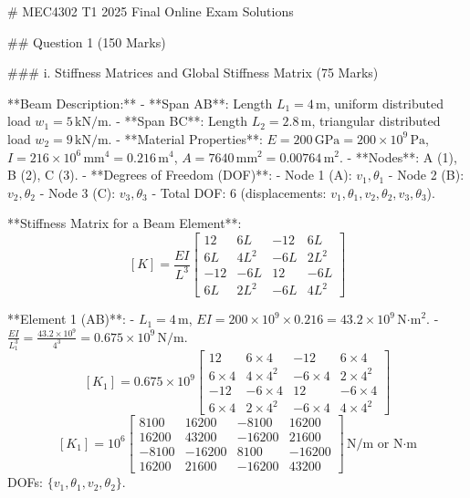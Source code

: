 # MEC4302 T1 2025 Final Online Exam Solutions

## Question 1 (150 Marks)

### i. Stiffness Matrices and Global Stiffness Matrix (75 Marks)

**Beam Description:**
- **Span AB**: Length \( L_1 = 4 \, \text{m} \), uniform distributed load \( w_1 = 5 \, \text{kN/m} \).
- **Span BC**: Length \( L_2 = 2.8 \, \text{m} \), triangular distributed load \( w_2 = 9 \, \text{kN/m} \).
- **Material Properties**: \( E = 200 \, \text{GPa} = 200 \times 10^9 \, \text{Pa} \), \( I = 216 \times 10^6 \, \text{mm}^4 = 0.216 \, \text{m}^4 \), \( A = 7640 \, \text{mm}^2 = 0.00764 \, \text{m}^2 \).
- **Nodes**: A (1), B (2), C (3).
- **Degrees of Freedom (DOF)**:
  - Node 1 (A): \( v_1, \theta_1 \)
  - Node 2 (B): \( v_2, \theta_2 \)
  - Node 3 (C): \( v_3, \theta_3 \)
  - Total DOF: 6 (displacements: \( v_1, \theta_1, v_2, \theta_2, v_3, \theta_3 \)).

**Stiffness Matrix for a Beam Element**:
\[
[K] = \frac{E I}{L^3} \begin{bmatrix}
12 & 6L & -12 & 6L \\
6L & 4L^2 & -6L & 2L^2 \\
-12 & -6L & 12 & -6L \\
6L & 2L^2 & -6L & 4L^2
\end{bmatrix}
\]

**Element 1 (AB)**:
- \( L_1 = 4 \, \text{m} \), \( E I = 200 \times 10^9 \times 0.216 = 43.2 \times 10^9 \, \text{N·m}^2 \).
- \( \frac{E I}{L_1^3} = \frac{43.2 \times 10^9}{4^3} = 0.675 \times 10^9 \, \text{N/m} \).
\[
[K_1] = 0.675 \times 10^9 \begin{bmatrix}
12 & 6 \times 4 & -12 & 6 \times 4 \\
6 \times 4 & 4 \times 4^2 & -6 \times 4 & 2 \times 4^2 \\
-12 & -6 \times 4 & 12 & -6 \times 4 \\
6 \times 4 & 2 \times 4^2 & -6 \times 4 & 4 \times 4^2
\end{bmatrix}
\]
\[
[K_1] = 10^6 \begin{bmatrix}
8100 & 16200 & -8100 & 16200 \\
16200 & 43200 & -16200 & 21600 \\
-8100 & -16200 & 8100 & -16200 \\
16200 & 21600 & -16200 & 43200
\end{bmatrix} \, \text{N/m or N·m}
\]
DOFs: \( \{ v_1, \theta_1, v_2, \theta_2 \} \).

